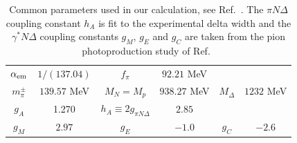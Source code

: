 \documentclass[twocolumn,prc,showpacs,nofootinbib,preprintnumbers,amsmath,amssymb,superscriptaddress]{revtex4-1}
\begin{document}
\begin{table}[htb]
\begin{tabular}{|c|c||c|c||c|c|}
\hline
$\alpha_{\rm em}$ & $1/(137.04)$&$f_\pi$ & $92.21$ MeV &&\\
$m_\pi^{\pm}$ & $139.57$ MeV &$M_N=M_p$ & $938.27$ MeV&$M_\Delta$ & $1232$ MeV\\
$g_A$ & 1.270 &  $h_A\equiv 2g_{\pi N \Delta}$& $2.85$&&\\
$g_M$ & $2.97$ & $g_E$ & $-1.0$&$g_C$ & $-2.6$\\
\hline
\end{tabular}
\caption{Common parameters used in our calculation, see Ref.~\cite{Agashe:2014kda}. The $\pi N\Delta$ coupling constant $h_A$ is fit to the experimental delta width and the $\gamma^* N \Delta$ coupling constants $g_M$, $g_E$ and $g_C$ are taken from the pion photoproduction study of Ref.~\cite{Pascalutsa:2005vq}} \label{tab:constants}
\end{table}

\end{document}
